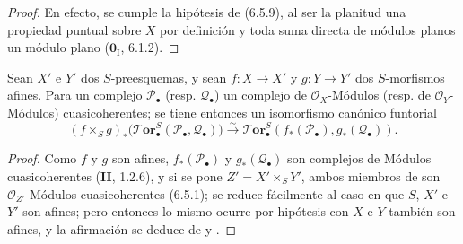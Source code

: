 \begin{proof}
En efecto, se cumple la hipótesis de (6.5.9), al ser la planitud una propiedad
puntual sobre $X$ por definición y toda suma directa de módulos planos
un módulo plano ($\mathbf{0}_{\mathrm I}$, 6.1.2).
\end{proof}

\begin{proposition}[6.5.11]
\label{III.6.5.11}
Sean $X'$ e $Y'$ dos $S$-preesquemas, y sean
$f:X\to X'$ y $g:Y\to Y'$ dos $S$-morfismos afines. Para un
complejo $\mathscr P_\bullet$ \textup{(resp.}
$\mathscr Q_\bullet$\textup{)} un complejo de $\mathscr O_X$-Módulos \textup{(resp.} de
$\mathscr O_Y$-Módulos\textup{)} cuasicoherentes; se tiene entonces un isomorfismo canónico funtorial
\[
  (f\times_S g)_*
  \bigl(\boldsymbol{\mathscr{T}\!or}_\bullet^S
    (\mathscr P_\bullet,\mathscr Q_\bullet)\bigr)
  \xrightarrow{\sim}
  \boldsymbol{\mathscr{T}\!or}_\bullet^S
  (f_*(\mathscr P_\bullet),g_*(\mathscr Q_\bullet)).
  \tag{6.5.11.1}\label{III.6.5.11.1.fr}
\]
\end{proposition}

\begin{proof}
Como $f$ y $g$ son afines, $f_*(\mathscr P_\bullet)$ y
$g_*(\mathscr Q_\bullet)$ son complejos de Módulos cuasicoherentes (\textbf{II}, 1.2.6), y si se pone $Z'=X'\times_S Y'$, ambos miembros de
 son $\mathscr O_{Z'}$-Módulos cuasicoherentes (6.5.1); se reduce fácilmente al caso en que $S$, $X'$ e $Y'$ son afines; pero entonces lo mismo ocurre por hipótesis con $X$ e $Y$ también son
afines, y la afirmación se deduce de  y
.
\end{proof}


